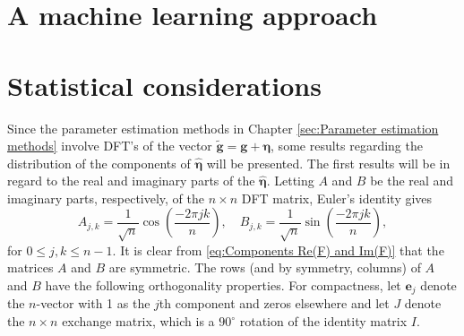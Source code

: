\documentclass[12pt,notitlepage]{report}
\newcommand{\gVec}{\mathbf{g}}	%
\newcommand{\gnoiseVec}{\widetilde{\mathbf{g}}}	%
\newcommand{\noise}{\eta}	%
\newcommand{\noiseVec}{\bm{\noise}}	%
\begin{document}
\chapter{A machine learning approach} \label{ch:Machine Learning}

\chapter{Statistical considerations} \label{sec:Stats.}

Since the parameter estimation methods in Chapter \ref{sec:Parameter estimation methods} involve DFT's of the vector $\gnoiseVec = \gVec + \noiseVec$, some results regarding the distribution of the components of $\widehat{\noiseVec}$ will be presented. The first results will be in regard to the real and imaginary parts of the $\widehat{\noiseVec}$. Letting $A$ and $B$ be the real and imaginary parts, respectively, of the $n \times n$ DFT matrix, Euler's identity gives
\begin{equation}
A_{j,k} = \frac{1}{\sqrt{n}}\cos\left(\frac{-2\pi{jk}}{n}\right), \quad B_{j,k} = \frac{1}{\sqrt{n}}\sin\left(\frac{-2\pi{jk}}{n}\right),
\label{eq:Components Re(F) and Im(F)}
\end{equation}
for $0 \leq j,k \leq n-1$. It is clear from \eqref{eq:Components Re(F) and Im(F)} that the matrices $A$ and $B$ are symmetric. The rows (and by symmetry, columns) of $A$ and $B$ have the following orthogonality properties. For compactness, let $\mathbf{e}_j$ denote the $n$-vector with 1 as the $j$th component and zeros elsewhere and let $J$ denote the $n \times n$ exchange matrix, which is a $90^\circ$ rotation of the identity matrix $I$.
\end{document}
